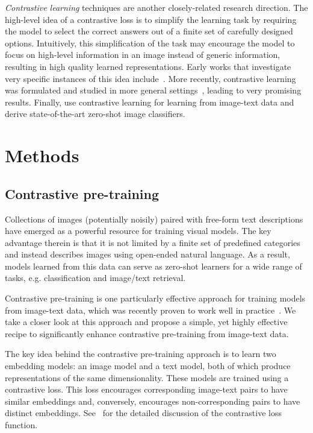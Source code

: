 \documentclass[10pt,twocolumn,letterpaper]{article}
\makeatletter
\renewcommand*{\eg}{e.g.\@\xspace}
\makeatother
\begin{document}
\textit{Contrastive learning} techniques are another closely-related research direction.
The high-level idea of a contrastive loss is to simplify the learning task by requiring the model to select the correct answers out of a finite set of carefully designed options.
Intuitively, this simplification of the task may encourage the model to focus on high-level information in an image instead of generic information, resulting in high quality learned representations.
Early works that investigate very specific instances of this idea include~\cite{rel-patch-location,jigsaw}. More recently, contrastive learning was formulated and studied in more general settings~\cite{cpc,simclr,moco}, leading to very promising results. Finally, \cite{clip,align} use contrastive learning for learning from image-text data and derive state-of-the-art zero-shot image classifiers.


\section{Methods}\label{sec:methods}


\subsection{Contrastive pre-training}\label{sec:contrastive_pre_train}

Collections of images (potentially noisily) paired with free-form text descriptions have emerged as a powerful resource for training visual models. The key advantage therein is that it is not limited by a finite set of predefined categories and instead describes images using open-ended natural language. As a result, models learned from this data can serve as zero-shot learners for a wide range of tasks, \eg classification and image/text retrieval.

Contrastive pre-training is one particularly effective approach for training models from image-text data, which was recently proven to work well in practice~\cite{clip,align}. We take a closer look at this approach and propose a simple, yet highly effective recipe to significantly enhance contrastive pre-training from image-text data.

The key idea behind the contrastive pre-training approach is to learn two embedding models: an image model and a text model, both of which produce representations of the same dimensionality. These models are trained using a contrastive loss. This loss encourages corresponding image-text pairs to have similar embeddings and, conversely, encourages non-corresponding pairs to have distinct embeddings. See~\cite{clip,convirt} for the detailed discussion of the contrastive loss function.
\end{document}
